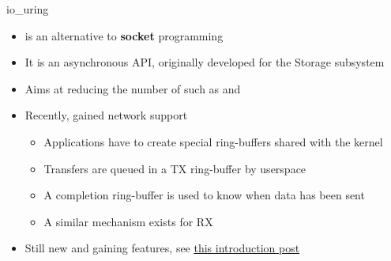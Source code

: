 \begin{frame}{io\_uring}
	\begin{itemize}
		\item {} is an alternative to \textbf{socket} programming
		\item It is an asynchronous API, originally developed for the Storage subsystem
		\item Aims at reducing the number of  such as  and 
		\item Recently,  gained network support
			\begin{itemize}
				\item Applications have to create special ring-buffers shared with the kernel
				\item Transfers are queued in a TX ring-buffer by userspace
				\item A completion ring-buffer is used to know when data has been sent
				\item A similar mechanism exists for RX
			\end{itemize}
		\item Still new and gaining features, see \href{https://developers.redhat.com/articles/2023/04/12/why-you-should-use-iouring-network-io}{this introduction post}
	\end{itemize}
\end{frame}

